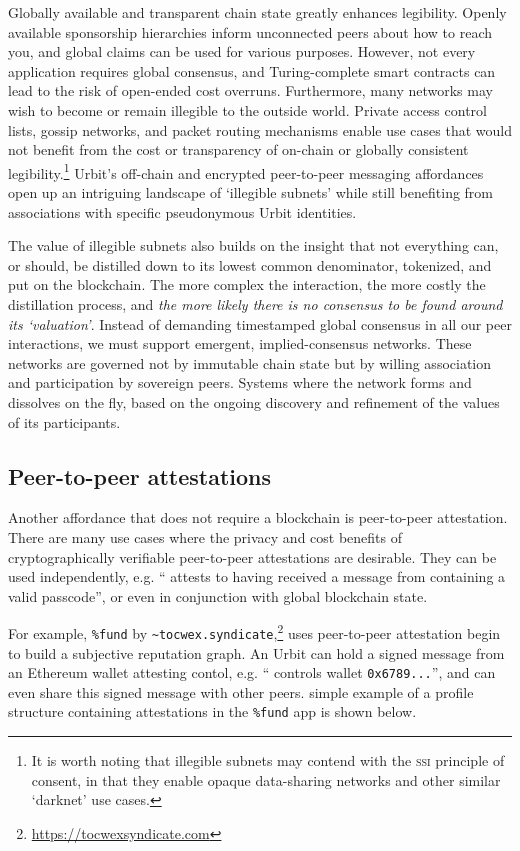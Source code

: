 \documentclass[twoside]{article}
\begin{document}
Globally available and transparent chain state greatly enhances legibility. Openly available sponsorship hierarchies inform unconnected peers about how to reach you, and global claims can be used for various purposes. However, not every application requires global consensus, and Turing-complete smart contracts can lead to the risk of open-ended cost overruns.  Furthermore, many networks may wish to become or remain illegible to the outside world. Private access control lists, gossip networks, and packet routing mechanisms enable use cases that would not benefit from the cost or transparency of on-chain or globally consistent legibility.\footnote{It is worth noting that illegible subnets may contend with the \textsc{ssi} principle of consent, in that they enable opaque data-sharing networks and other similar `darknet' use cases.} Urbit's off-chain and encrypted peer-to-peer messaging affordances open up an intriguing landscape of `illegible subnets' while still benefiting from associations with specific pseudonymous Urbit identities.

The value of illegible subnets also builds on the insight that not everything can, or should, be distilled down to its lowest common denominator, tokenized, and put on the blockchain. The more complex the interaction, the more costly the distillation process, and \emph{the more likely there is no consensus to be found around its `valuation'}. Instead of demanding timestamped global consensus in all our peer interactions, we must support emergent, implied-consensus networks. These networks are governed not by immutable chain state but by willing association and participation by sovereign peers. Systems where the network forms and dissolves on the fly, based on the ongoing discovery and refinement of the values of its participants.

\subsection{Peer-to-peer attestations}

Another affordance that does not require a blockchain is peer-to-peer attestation. There are many use cases where the privacy and cost benefits of cryptographically verifiable peer-to-peer attestations are desirable. They can be used independently, e.g. `` attests to having received a message from  containing a valid passcode'', or even in conjunction with global blockchain state.

\sloppy
For example, \lstinline[style=inlinecode]{%fund} by \lstinline[style=inlinecode]{~tocwex.syndicate},\footnote{\url{https://tocwexsyndicate.com}} uses peer-to-peer attestation begin to build a subjective reputation graph. An Urbit can hold a signed message from an Ethereum wallet attesting contol, e.g. `` controls wallet \lstinline[style=inlinecode]{0x6789...}'', and can even share this signed message with other peers. simple example of a profile structure containing attestations in the \lstinline[style=inlinecode]{%fund} app is shown below.
\end{document}
